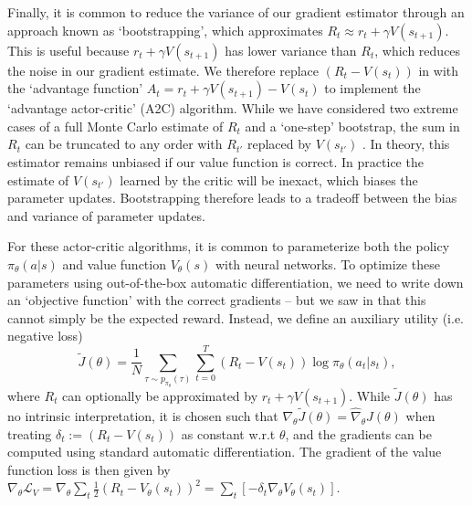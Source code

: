 Finally, it is common to reduce the variance of our gradient estimator through an approach known as `bootstrapping', which approximates $R_t \approx r_t + \gamma V(s_{t+1})$.
This is useful because $r_t + \gamma V(s_{t+1})$ has lower variance than $R_t$, which reduces the noise in our gradient estimate.
We therefore replace $(R_t - V(s_t))$ in  with the `advantage function' $A_t = r_t + \gamma V(s_{t+1}) - V(s_t)$ to implement the `advantage actor-critic' (A2C) algorithm.
While we have considered two extreme cases of a full Monte Carlo estimate of $R_t$ and a `one-step' bootstrap, the sum in $R_t$ can be truncated to any order with $R_{t'}$ replaced by $V(s_{t'})$ \citep{sutton2018reinforcement}.
In theory, this estimator remains unbiased if our value function is correct.
In practice the estimate of $V(s_{t'})$ learned by the critic will be inexact, which biases the parameter updates.
Bootstrapping therefore leads to a tradeoff between the bias and variance of parameter updates.

For these actor-critic algorithms, it is common to parameterize both the policy $\pi_\theta(a|s)$ and value function $V_\theta(s)$ with neural networks.
To optimize these parameters using out-of-the-box automatic differentiation, we need to write down an `objective function' with the correct gradients -- but we saw in  that this cannot simply be the expected reward.
Instead, we define an auxiliary utility (i.e. negative loss)
\begin{equation}
    \label{eq:Jtilde}
    \tilde{J}(\theta) = \frac{1}{N} \sum_{\tau \sim p_{\pi_\theta}(\tau)}  \sum_{t=0}^T (R_t - V(s_t)) \log \pi_\theta (a_t|s_t),
\end{equation}
where $R_t$ can optionally be approximated by $r_t + \gamma V(s_{t+1})$.
While $\tilde{J}(\theta)$ has no intrinsic interpretation, it is chosen such that $\nabla_\theta \tilde{J}(\theta) = \hat{\nabla}_\theta J(\theta)$ when treating $\delta_t := (R_t - V(s_t))$ as constant w.r.t $\theta$, and the gradients can be computed using standard automatic differentiation.
The gradient of the value function loss is then given by $\nabla_\theta \mathcal{L}_V = \nabla_\theta \sum_t \frac12  (R_t - V_\theta(s_t))^2 = \sum_t \left [ - \delta_t \nabla_\theta V_\theta(s_t) \right ]$.



